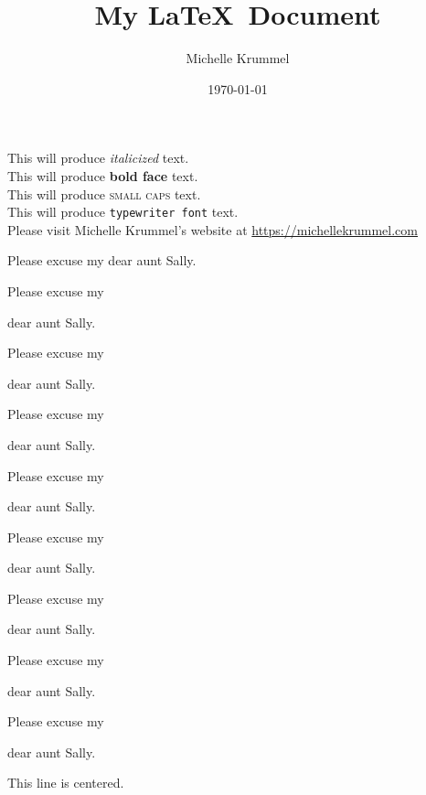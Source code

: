 \documentclass[11pt]{article}
\title{My \LaTeX\ Document}
\author{Michelle Krummel}
\date{\today}
\begin{document}
\tableofcontents
\maketitle

  This will produce \textit{italicized} text.\\
  This will produce \textbf{bold face} text.\\
  This will produce \textsc{small caps} text.\\
  This will produce \texttt{typewriter font} text.\\
  Please visit Michelle Krummel's website at \url{https://michellekrummel.com}

  \vspace{1cm}

  Please excuse my dear aunt Sally.

  Please excuse my \begin{large}dear aunt Sally.\end{large}

  Please excuse my \begin{Large}dear aunt Sally.\end{Large}

  Please excuse my \begin{huge}dear aunt Sally.\end{huge}

  Please excuse my \begin{Huge}dear aunt Sally.\end{Huge}

  Please excuse my \begin{normalsize}dear aunt Sally.\end{normalsize}

  Please excuse my \begin{small}dear aunt Sally.\end{small}

  Please excuse my \begin{scriptsize}dear aunt Sally.\end{scriptsize}

  Please excuse my \begin{tiny}dear aunt Sally.\end{tiny}

  \vspace{1cm}

  \begin{center}This line is centered.\end{center}
\end{document}
